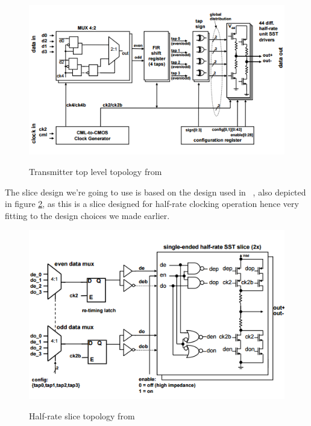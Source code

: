 \begin{figure}[H]
  \centering
  {\includegraphics[scale=0.55]{img/topology_tx1.png}}
  \caption{Transmitter top level topology from ~\cite{menolfi2007a}}
  \label{fig:topology1}
\end{figure}


The slice design we're going to use is based on the design used in ~\cite{menolfi2007a}, also depicted in figure \ref{fig:topology0}, as this is a slice designed for half-rate clocking operation hence very fitting to the design choices we made earlier.

\begin{figure}[H]
  \centering
  {\includegraphics[scale=0.55]{img/topology_tx0.png}}
  \caption{Half-rate slice topology from ~\cite{menolfi2007a}}
  \label{fig:topology0}
\end{figure}

